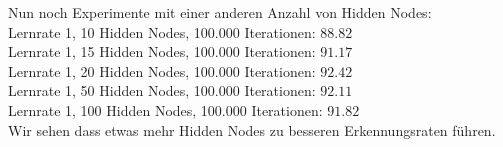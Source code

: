 \documentclass{article}
\begin{document}
  Nun noch Experimente mit einer anderen Anzahl von Hidden Nodes:\\
  Lernrate 1, 10 Hidden Nodes, 100.000 Iterationen: $ 88.82 $\\
  Lernrate 1, 15 Hidden Nodes, 100.000 Iterationen: $ 91.17 $\\
  Lernrate 1, 20 Hidden Nodes, 100.000 Iterationen: $ 92.42 $\\
  Lernrate 1, 50 Hidden Nodes, 100.000 Iterationen: $ 92.11 $\\
  Lernrate 1, 100 Hidden Nodes, 100.000 Iterationen: $ 91.82 $\\
  
  Wir sehen dass etwas mehr Hidden Nodes zu besseren Erkennungsraten führen.
  
\end{document}
